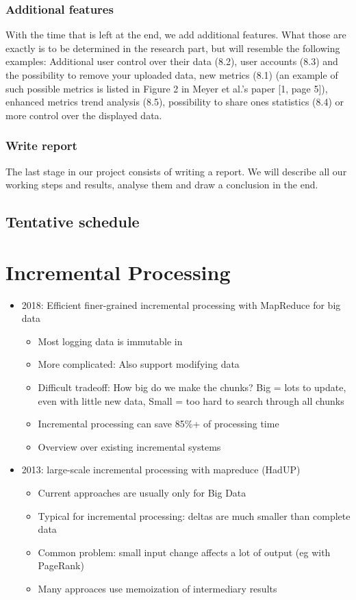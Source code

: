 \documentclass{seal_article}
\begin{document}
\subsubsection{Additional features}
With the time that is left at the end, we add additional features. What those are exactly is to be determined in the research part, but will resemble the following examples: Additional user control over their data (8.2), user accounts (8.3) and the possibility to remove your uploaded data, new metrics (8.1) (an example of such possible metrics is listed in Figure 2 in Meyer et al.’s paper [1, page 5]), enhanced metrics trend analysis (8.5), possibility to share ones statistics (8.4) or more control over the displayed data.

\subsubsection{Write report}
The last stage in our project consists of writing a report. We will describe all our working steps and results, analyse them and draw a conclusion in the end.

\subsection{Tentative schedule}

\section{Incremental Processing}
\begin{itemize}
\item 2018: Efficient finer-grained incremental processing with MapReduce for big data
\begin{itemize}
\item Most logging data is immutable in
\item More complicated: Also support modifying data
\item Difficult tradeoff: How big do we make the chunks? Big = lots to update, even with little new data, Small = too hard to search through all chunks
\item Incremental processing can save 85\%+ of processing time
\item Overview over existing incremental systems
\end{itemize}
\item 2013: large-scale incremental processing with mapreduce (HadUP)
\begin{itemize}
\item Current approaches are usually only for Big Data
\item Typical for incremental processing: deltas are much smaller than complete data
\item Common problem: small input change affects a lot of output (eg with PageRank)
\item Many approaces use memoization of intermediary results
\end{itemize}
\end{itemize}




\end{document}
